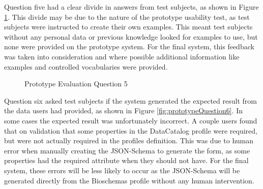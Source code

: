 {
Question five had a clear divide in answers from test subjects, as shown in Figure \ref{fig:prototypeQuestion5}. This divide may be due to the nature of the prototype usability test, as test subjects were instructed to create their own examples. This meant test subjects without any personal data or previous knowledge looked for examples to use, but none were provided on the prototype system. For the final system, this feedback was taken into consideration and where possible additional information like examples and controlled vocabularies were provided.\newline
\begin{figure}[!h]
  \centering
  \begin{minipage}[b]{0.47\textwidth}
    \caption{Prototype Evaluation Question 5}
    \label{fig:prototypeQuestion5}
  \end{minipage}
\end{figure}

Question six asked test subjects if the system generated the expected result from the data users had provided, as shown in Figure \ref{fig:prototypeQuestion6}. In some cases the expected result was unfortunately incorrect. A couple users found that on validation that some properties in the DataCatalog profile were required, but were not actually required in the profiles definition. This was due to human error when manually creating the JSON-Schema to generate the form, as some properties had the required attribute when they should not have. For the final system, these errors will be less likely to occur as the JSON-Schema will be generated directly from the Bioschemas profile without any human intervention. \newline

}
